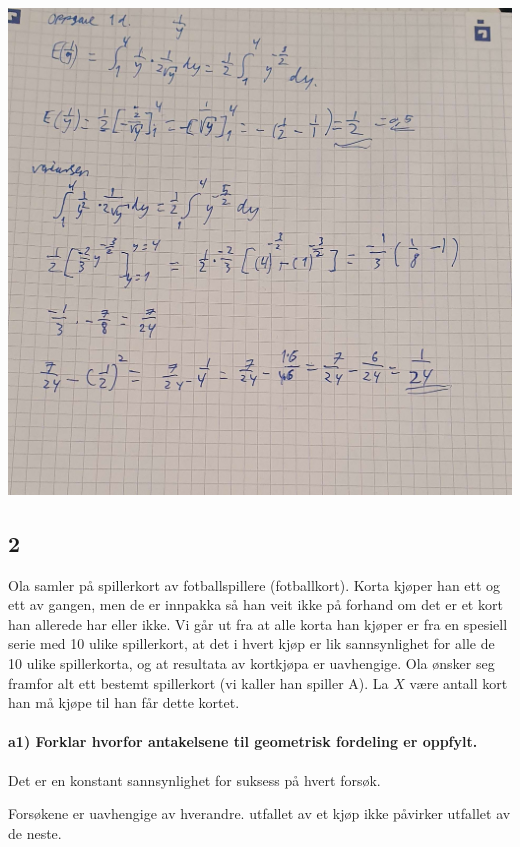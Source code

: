 \documentclass[
  12pt,
  a4paper,
  DIV=11,
  numbers=noendperiod]{scrartcl}
\let\oldparagraph\paragraph
\renewcommand{\paragraph}[1]{\oldparagraph{#1}\mbox{}}
\begin{document}
\includegraphics{oblig2_utregning/oppgave1_d.jpg}

\subsection{2}\label{section-1}

Ola samler på spillerkort av fotballspillere (fotballkort). Korta kjøper
han ett og ett av gangen, men de er innpakka så han veit ikke på forhand
om det er et kort han allerede har eller ikke. Vi går ut fra at alle
korta han kjøper er fra en spesiell serie med 10 ulike spillerkort, at
det i hvert kjøp er lik sannsynlighet for alle de 10 ulike spillerkorta,
og at resultata av kortkjøpa er uavhengige. Ola ønsker seg framfor alt
ett bestemt spillerkort (vi kaller han spiller A). La \(X\) være antall
kort han må kjøpe til han får dette kortet.

\paragraph{a1) Forklar hvorfor antakelsene til geometrisk fordeling er
oppfylt.}\label{a1-forklar-hvorfor-antakelsene-til-geometrisk-fordeling-er-oppfylt.}

Det er en konstant sannsynlighet for suksess på hvert forsøk.

Forsøkene er uavhengige av hverandre. utfallet av et kjøp ikke påvirker
utfallet av de neste.
\end{document}
